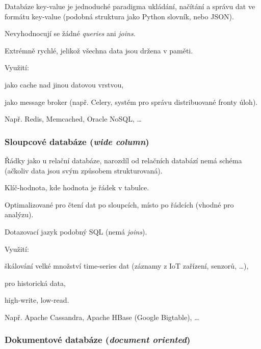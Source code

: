 \begin{compactitem}
    \item Databáze key-value je jednoduché paradigma ukládání, načítání a správu dat ve formátu key-value (podobná struktura jako Python slovník, nebo JSON).
    \item Nevyhodnocují se žádné \textit{queries} ani \textit{joins}.
    \item Extrémně rychlé, jelikož všechna data jsou držena v paměti.
    \item Využití: \begin{compactitem}
        \item jako cache nad jinou datovou vrstvou,
        \item jako message broker (např. Celery, systém pro správu distribuované fronty úloh).
    \end{compactitem}
    \item Např. Redis, Memcached, Oracle NoSQL, \dots
\end{compactitem}

\subsubsection*{Sloupcové databáze (\textit{wide column})}

\begin{compactitem}
    \item Řádky jako u relační databáze, narozdíl od relačních databází nemá schéma (ačkoliv data jsou svým způsobem strukturovaná).
    \item Klíč-hodnota, kde hodnota je řádek v tabulce.
    \item Optimalizované pro čtení dat po sloupcích, místo po řádcích (vhodné pro analýzu).
    \item Dotazovací jazyk podobný SQL (nemá \textit{joins}).
    \item Využití: \begin{compactitem}
        \item škálování velké množství time-series dat (záznamy z IoT zařízení, senzorů, \dots),
        \item pro historická data,
        \item high-write, low-read.
    \end{compactitem}
    \item Např. Apache Cassandra, Apache HBase (Google Bigtable), \dots
\end{compactitem}

\subsubsection*{Dokumentové databáze (\textit{document oriented})}


